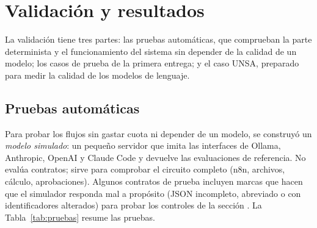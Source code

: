 \documentclass[12pt,letterpaper]{article}
\begin{document}
\section{Validación y resultados}

La validación tiene tres partes: las pruebas automáticas, que comprueban la parte determinista y el funcionamiento del sistema sin depender de la calidad de un modelo; los casos de prueba de la primera entrega; y el caso UNSA, preparado para medir la calidad de los modelos de lenguaje.

\subsection{Pruebas automáticas}
\label{sec:pruebas-auto}

Para probar los flujos sin gastar cuota ni depender de un modelo, se construyó un \emph{modelo simulado}: un pequeño servidor que imita las interfaces de Ollama, Anthropic, OpenAI y Claude Code y devuelve las evaluaciones de referencia. No evalúa contratos; sirve para comprobar el circuito completo (n8n, archivos, cálculo, aprobaciones). Algunos contratos de prueba incluyen marcas que hacen que el simulador responda mal a propósito (JSON incompleto, abreviado o con identificadores alterados) para probar los controles de la sección . La Tabla~\ref{tab:pruebas} resume las pruebas.
\end{document}

